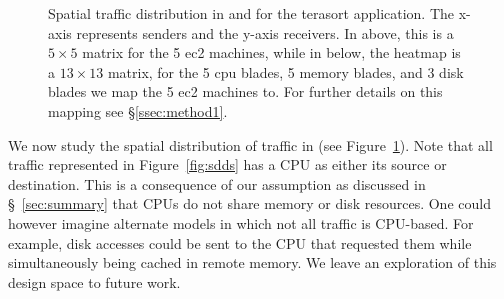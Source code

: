 \begin{figure}[t]
  \centering
  \caption{\small{Spatial traffic distribution in \pdis and \dis for the terasort application. The x-axis represents senders and the y-axis receivers. In \pdis above, this is a $5 \times 5$ matrix for the 5 ec2 machines, while in \dis below, the heatmap is a $13 \times 13$ matrix, for the 5 cpu blades, 5 memory blades, and 3 disk blades we map the 5 ec2 machines to. For further details on this mapping see \S\ref{ssec:method1}.}}
  
  \label{fig:sd}
\end{figure}
%
We now study the spatial distribution of traffic in \dis (see Figure~\ref{fig:sd}). Note that all traffic represented in Figure~\ref{fig:sdds} has a CPU as either its source or destination. This is a consequence of our assumption as discussed in \S~\ref{sec:summary} that CPUs do not share memory or disk resources. One could however imagine alternate models in which not all traffic is CPU-based. For example, disk accesses could be sent to the CPU that requested them while simultaneously being cached in remote memory. We leave an exploration of this design space to future work.


